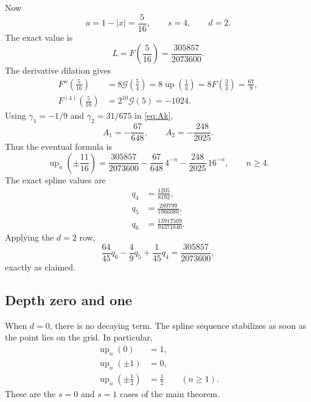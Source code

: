\documentclass[11pt]{article}
\newcommand{\upf}{\operatorname{up}}
\newcommand{\G}{\mathcal{G}}
\begin{document}
Now
\begin{equation}
 a=1-|x|=\frac5{16},
 \qquad s=4,
 \qquad d=2.
\end{equation}
The exact value is
\begin{equation}
 L=F\!\left(\frac5{16}\right)
 =\frac{305857}{2073600}.
 \label{eq:five-sixteenths-value}
\end{equation}
The derivative dilation gives
\begin{align}
 F''\!\left(\frac5{16}\right)
 &=8\G\!\left(\frac54\right)
 =8\upf\!\left(\frac14\right)
 =8F\!\left(\frac34\right)
 =\frac{67}{9},\\
 F^{(4)}\!\left(\frac5{16}\right)
 &=2^{10}\G(5)=-1024.
 \label{eq:five-sixteenths-derivatives}
\end{align}
Using $\gamma_1=-1/9$ and $\gamma_2=31/675$ in \eqref{eq:Ak},
\begin{equation}
 A_1=-\frac{67}{648},
 \qquad
 A_2=-\frac{248}{2025}.
\end{equation}
Thus the eventual formula is
\begin{equation}
 \boxed{
 \upf_n\!\left(\pm\frac{11}{16}\right)
 =\frac{305857}{2073600}
 -\frac{67}{648}\,4^{-n}
 -\frac{248}{2025}\,16^{-n},
 \qquad n\ge4.}
 \label{eq:five-sixteenths-tail}
\end{equation}
The exact spline values are
\begin{align}
 q_4&=\frac{1205}{8192},\\
 q_5&=\frac{289799}{1966080},\\
 q_6&=\frac{13917509}{94371840}.
 \label{eq:q456}
\end{align}
Applying the $d=2$ row,
\begin{equation}
 \frac{64}{45}q_6-\frac49q_5+\frac1{45}q_4
 =\frac{305857}{2073600},
 \label{eq:example-extraction}
\end{equation}
exactly as claimed.

\subsection{Depth zero and one}

When $d=0$, there is no decaying term.  The spline sequence stabilizes as soon
as the point lies on the grid.  In particular,
\begin{align}
 \upf_n(0)&=1,\\
 \upf_n(\pm1)&=0,\\
 \upf_n\!\left(\pm\frac12\right)&=\frac12\qquad(n\ge1).
\end{align}
These are the $s=0$ and $s=1$ cases of the main theorem.
\end{document}
